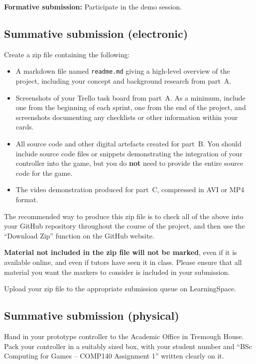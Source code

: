 \documentclass{../fal_assignment}
\begin{document}
\textbf{Formative submission:} Participate in the demo session.

\subsection*{Summative submission (electronic)}

Create a zip file containing the following:

\begin{itemize}
\item A markdown file named \texttt{readme.md} giving a high-level overview of the project,
    including your concept and background research from part~A.
\item Screenshots of your Trello task board from part~A.
    As a minimum, include one from the beginning of each sprint,
    one from the end of the project,
    and screenshots documenting any checklists or other information within your cards.
\item All source code and other digital artefacts created for part~B.
    You should include source code files or snippets demonstrating the integration of your controller into the game,
    but you do \textbf{not} need to provide the entire source code for the game.
\item The video demonstration produced for part~C, compressed in AVI or MP4 format.
\end{itemize}

The recommended way to produce this zip file is to check all of the above into your GitHub repository
throughout the course of the project,
and then use the ``Download Zip'' function on the GitHub website.

\textbf{Material not included in the zip file will not be marked},
even if it is available online, and even if tutors have seen it in class.
Please ensure that all material you want the markers to consider is included in your submission.

Upload your zip file to the appropriate submission queue on LearningSpace.

\subsection*{Summative submission (physical)}

Hand in your prototype controller to the Academic Office in Tremough House.
Pack your controller in a suitably sized box, with your student number
and ``BSc Computing for Games -- COMP140 Assignment 1'' written clearly on it.
\end{document}
